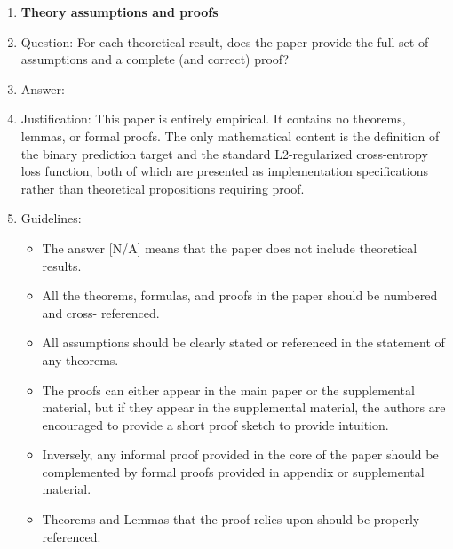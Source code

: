 \documentclass{article}
\begin{document}
\begin{enumerate}
\begin{itemize}
        \item If applicable, the authors should discuss possible limitations of their approach to
address problems of privacy and fairness.
        \item While the authors might fear that complete honesty about limitations might be used by
reviewers as grounds for rejection, a worse outcome might be that reviewers discover
limitations that aren't acknowledged in the paper. The authors should use their best
judgment and recognize that individual actions in favor of transparency play an impor-
tant role in developing norms that preserve the integrity of the community. Reviewers
will be specifically instructed to not penalize honesty concerning limitations.
    \end{itemize}

\item {\bf Theory assumptions and proofs}
    \item[] Question: For each theoretical result, does the paper provide the full set of assumptions and
a complete (and correct) proof?
    \item[] Answer: \answerNA{}
    \item[] Justification: This paper is entirely empirical. It contains no theorems, lemmas, or
    formal proofs. The only mathematical content is the definition of the binary prediction
    target and the standard L2-regularized cross-entropy loss function, both of which are
    presented as implementation specifications rather than theoretical propositions requiring proof.
    \item[] Guidelines:
    \begin{itemize}
        \item The answer [N/A] means that the paper does not include theoretical results.
        \item All the theorems, formulas, and proofs in the paper should be numbered and cross-
referenced.
        \item All assumptions should be clearly stated or referenced in the statement of any theorems.
        \item The proofs can either appear in the main paper or the supplemental material, but if
they appear in the supplemental material, the authors are encouraged to provide a short
proof sketch to provide intuition.
        \item Inversely, any informal proof provided in the core of the paper should be complemented
by formal proofs provided in appendix or supplemental material.
        \item Theorems and Lemmas that the proof relies upon should be properly referenced.
    \end{itemize}


\end{enumerate}
\end{document}
